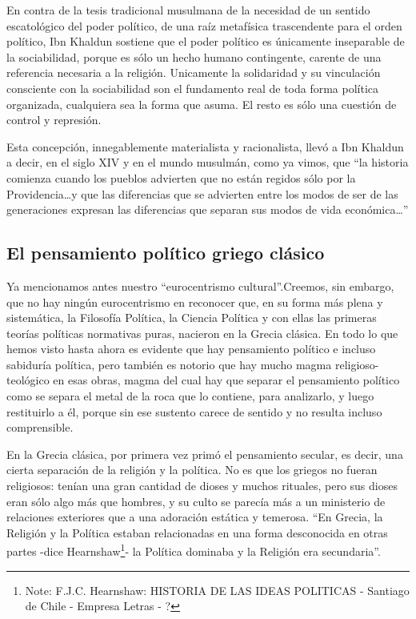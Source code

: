 \documentclass[
]{book}
\begin{document}
En contra de la tesis tradicional musulmana de la necesidad de un sentido escatológico del poder político, de una raíz metafísica trascendente para el orden político, Ibn Khaldun sostiene que el poder político es únicamente inseparable de la sociabilidad, porque es sólo un hecho humano contingente, carente de una referencia necesaria a la religión. Unicamente la solidaridad y su vinculación consciente con la sociabilidad son el fundamento real de toda forma política organizada, cualquiera sea la forma que asuma. El resto es sólo una cuestión de control y represión.

Esta concepción, innegablemente materialista y racionalista, llevó a Ibn Khaldun a decir, en el siglo XIV y en el mundo musulmán, como ya vimos, que ``la historia comienza cuando los pueblos advierten que no están regidos sólo por la Providencia\ldots y que las diferencias que se advierten entre los modos de ser de las generaciones expresan las diferencias que separan sus modos de vida económica\ldots{}''

\hypertarget{el-pensamiento-poluxedtico-griego-cluxe1sico}{%
\subsection*{El pensamiento político griego clásico}\label{el-pensamiento-poluxedtico-griego-cluxe1sico}}

Ya mencionamos antes nuestro ``eurocentrismo cultural''.Creemos, sin embargo, que no hay ningún eurocentrismo en reconocer que, en su forma más plena y sistemática, la Filosofía Política, la Ciencia Política y con ellas las primeras teorías políticas normativas puras, nacieron en la Grecia clásica. En todo lo que hemos visto hasta ahora es evidente que hay pensamiento político e incluso sabiduría política, pero también es notorio que hay mucho magma religioso-teológico en esas obras, magma del cual hay que separar el pensamiento político como se separa el metal de la roca que lo contiene, para analizarlo, y luego restituirlo a él, porque sin ese sustento carece de sentido y no resulta incluso comprensible.

En la Grecia clásica, por primera vez primó el pensamiento secular, es decir, una cierta separación de la religión y la política. No es que los griegos no fueran religiosos: tenían una gran cantidad de dioses y muchos rituales, pero sus dioses eran sólo algo más que hombres, y su culto se parecía más a un ministerio de relaciones exteriores que a una adoración estática y temerosa. ``En Grecia, la Religión y la Política estaban relacionadas en una forma desconocida en otras partes -dice Hearnshaw\footnote{Note: F.J.C. Hearnshaw: HISTORIA DE LAS IDEAS POLITICAS - Santiago de Chile - Empresa Letras - ?}- la Política dominaba y la Religión era secundaria''.
\end{document}
